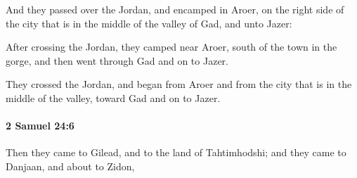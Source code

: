 			\begin{versebox}
					\item[BHS] 
					\item[ASV] And they passed over the Jordan, and encamped in Aroer, on the right side of the city that is in the middle of the valley of Gad, and unto Jazer:
					\item[NIV] After crossing the Jordan, they camped near Aroer, south of the town in the gorge, and then went through Gad and on to Jazer.
					\item[NRSV] They crossed the Jordan, and began from Aroer and from the city that is in the middle of the valley, toward Gad and on to Jazer.
			\end{versebox}

		\paragraph{2 Samuel 24:6} %
			\label{2SAMUEL-24-6}

			Then they came to Gilead, and to the land of Tahtimhodshi; and they came to Danjaan, and about to Zidon,

